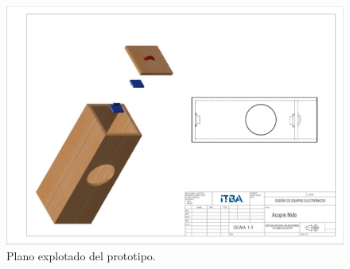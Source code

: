 \begin{figure}[H]
	\centering
	\includegraphics[width=0.9\linewidth]{ImagenesApendice/explotado_nido}
	\caption{Plano explotado del prototipo.}
	\label{fig:explotado_nido_plano}
\end{figure}

